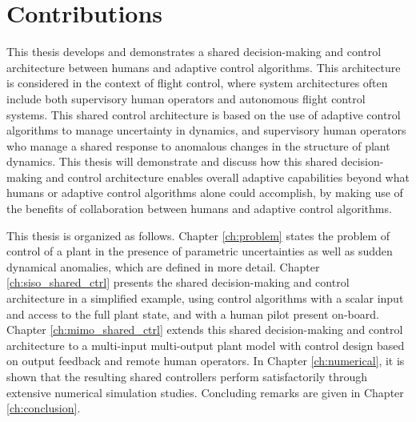 \section{Contributions}

This thesis develops and demonstrates a shared decision-making and control architecture between humans and adaptive control algorithms. This architecture is considered in the context of flight control, where system architectures often include both supervisory human operators and autonomous flight control systems. This shared control architecture is based on the use of adaptive control algorithms to manage uncertainty in dynamics, and supervisory human operators who manage a shared response to anomalous changes in the structure of plant dynamics. This thesis will demonstrate and discuss how this shared decision-making and control architecture enables overall adaptive capabilities beyond what humans or adaptive control algorithms alone could accomplish, by making use of the benefits of collaboration between humans and adaptive control algorithms. 

This thesis is organized as follows. Chapter \ref{ch:problem} states the problem of control of a plant in the presence of parametric uncertainties as well as sudden dynamical anomalies, which are defined in more detail. Chapter \ref{ch:siso_shared_ctrl} presents the shared decision-making and control architecture in a simplified example, using control algorithms with a scalar input and access to the full plant state, and with a human pilot present on-board. Chapter \ref{ch:mimo_shared_ctrl} extends this shared decision-making and control architecture to a multi-input multi-output plant model with control design based on output feedback and remote human operators. In Chapter \ref{ch:numerical}, it is shown that the resulting shared controllers perform satisfactorily through extensive numerical simulation studies. Concluding remarks are given in Chapter \ref{ch:conclusion}.

